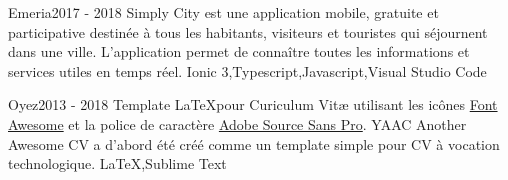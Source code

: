 %
%
%


\begin{projects}
	\project
	{Emeria}{2017 - 2018}
	{  }
	{Simply City est une application mobile, gratuite et participative destinée à tous les habitants, visiteurs et touristes qui séjournent dans une ville. L’application permet de connaître toutes les informations et services utiles en temps réel.}
	{Ionic 3,Typescript,Javascript,Visual Studio Code}
				
	\project
	{Oyez}{2013 - 2018}
	{ }
	{Template \LaTeX pour Curiculum Vitæ utilisant les icônes \href{https://fontawesome.com}{Font Awesome} et la police de caractère \href{https://fonts.google.com/specimen/Source+Sans+Pro}{Adobe Source Sans Pro}. YAAC Another Awesome CV a d'abord été créé comme un template simple pour CV à vocation technologique.}
	{\LaTeX,Sublime Text}

\end{projects}